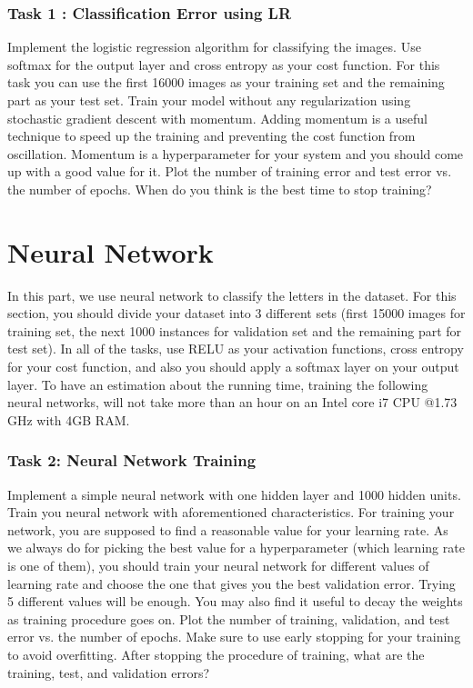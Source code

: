\documentclass[12pt]{article}
\begin{document}
\subsubsection*{Task 1 : Classification Error using LR}
Implement the logistic regression algorithm for classifying the images. Use softmax for the output layer and cross entropy as your cost function. For this task you can use the first 16000 images as your training set and the remaining part as your test set. Train your model without any regularization using stochastic gradient descent with momentum. Adding momentum is a useful technique to speed up the training and preventing the cost function from oscillation. Momentum is a hyperparameter for your system and you should come up with a good value for it. Plot the number of training error and test error vs. the number of epochs. When do you think is the best time to stop training?


\section{Neural Network}

In this part, we use neural network to classify the letters in the dataset. For this section, you should divide your dataset into 3 different sets (first 15000 images for training set, the next 1000 instances for validation set and the remaining part for test set). In all of the tasks, use RELU as your activation functions, cross entropy for your cost function, and also you should apply a softmax layer on your output layer. To have an estimation about the running time, training the following neural networks, will not take more than an hour on an Intel core i7 CPU @1.73 GHz with 4GB RAM.

\subsubsection*{Task 2: Neural Network Training}
Implement a simple neural network with one hidden layer and 1000 hidden units. Train you neural network with aforementioned characteristics. For training your network, you are supposed to find a reasonable value for your learning rate. As we always do for picking the best value for a hyperparameter (which learning rate is one of them), you should train your neural network for different values of learning rate and choose the one that gives you the best validation error. Trying 5 different values will be enough. You may also find it useful to decay the weights as training procedure goes on. Plot the number of training, validation, and test error vs. the number of epochs. Make sure to use early stopping for your training to avoid overfitting. After stopping the procedure of training, what are the training, test, and validation errors?
\end{document}
